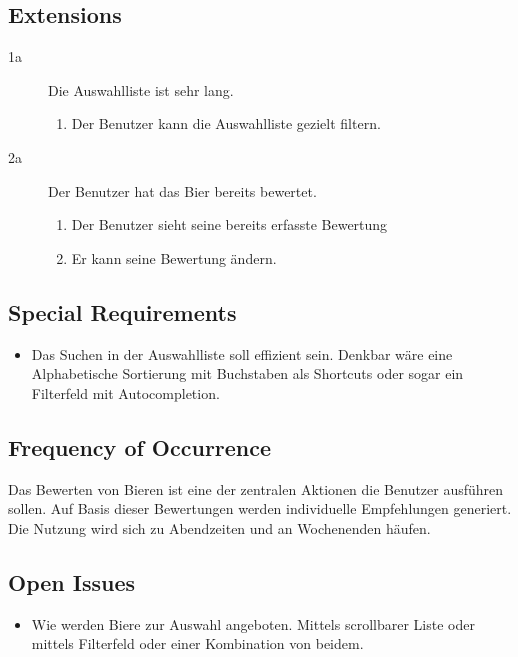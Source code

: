 \documentclass[10pt,a4paper]{scrartcl}
\begin{document}
\subsection*{Extensions}

\begin{description}
\item[1a] Die Auswahlliste ist sehr lang.
	\begin{enumerate}
	\item Der Benutzer kann die Auswahlliste gezielt filtern.
	\end{enumerate}
\item[2a] Der Benutzer hat das Bier bereits bewertet.
	\begin{enumerate}
	\item Der Benutzer sieht seine bereits erfasste Bewertung
	\item Er kann seine Bewertung ändern.
	\end{enumerate}

\end{description}


\subsection*{Special Requirements}

\begin{itemize}
\item Das Suchen in der Auswahlliste soll effizient sein. Denkbar wäre eine Alphabetische Sortierung mit Buchstaben als Shortcuts oder sogar ein Filterfeld mit Autocompletion.
\end{itemize}


\subsection*{Frequency of Occurrence}

Das Bewerten von Bieren ist eine der zentralen Aktionen die Benutzer ausführen sollen.
Auf Basis dieser Bewertungen werden individuelle Empfehlungen generiert. Die Nutzung wird sich zu Abendzeiten und an Wochenenden häufen.

\subsection*{Open Issues}

\begin{itemize}
\item Wie werden Biere zur Auswahl angeboten. Mittels scrollbarer Liste oder mittels Filterfeld oder einer Kombination von beidem.
\end{itemize}
\end{document}
